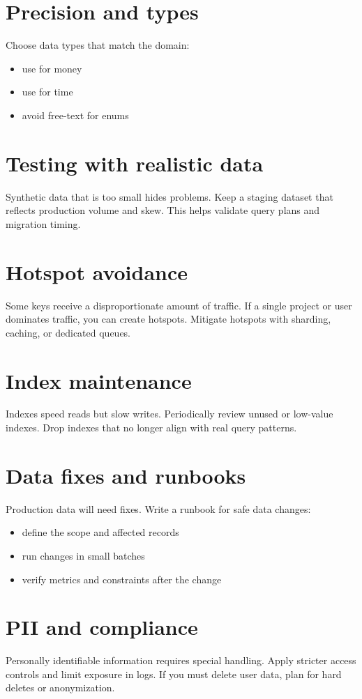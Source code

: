\section{Precision and types}
Choose data types that match the domain:
\begin{itemize}[nosep]
  \item use  for money
  \item use  for time
  \item avoid free-text for enums
\end{itemize}

\section{Testing with realistic data}
Synthetic data that is too small hides problems.
Keep a staging dataset that reflects production volume and skew.
This helps validate query plans and migration timing.

\section{Hotspot avoidance}
Some keys receive a disproportionate amount of traffic.
If a single project or user dominates traffic, you can create hotspots.
Mitigate hotspots with sharding, caching, or dedicated queues.

\section{Index maintenance}
Indexes speed reads but slow writes.
Periodically review unused or low-value indexes.
Drop indexes that no longer align with real query patterns.

\section{Data fixes and runbooks}
Production data will need fixes.
Write a runbook for safe data changes:
\begin{itemize}[nosep]
  \item define the scope and affected records
  \item run changes in small batches
  \item verify metrics and constraints after the change
\end{itemize}

\section{PII and compliance}
Personally identifiable information requires special handling.
Apply stricter access controls and limit exposure in logs.
If you must delete user data, plan for hard deletes or anonymization.

